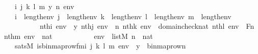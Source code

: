 \begin{isabellebody}
\ \ \ i\ j\ k\ l\ m\ y\ n\ env\ \isanewline
\ \ \ {\isachardoublequoteopen}i\ {\isacharless}{\kern0pt}\ length{\isacharparenleft}{\kern0pt}env{\isacharparenright}{\kern0pt}{\isachardoublequoteclose}\ {\isachardoublequoteopen}j\ {\isacharless}{\kern0pt}\ length{\isacharparenleft}{\kern0pt}env{\isacharparenright}{\kern0pt}{\isachardoublequoteclose}\ {\isachardoublequoteopen}k\ {\isacharless}{\kern0pt}\ length{\isacharparenleft}{\kern0pt}env{\isacharparenright}{\kern0pt}{\isachardoublequoteclose}\ {\isachardoublequoteopen}l\ {\isacharless}{\kern0pt}\ length{\isacharparenleft}{\kern0pt}env{\isacharparenright}{\kern0pt}{\isachardoublequoteclose}\ {\isachardoublequoteopen}m\ {\isacharless}{\kern0pt}\ length{\isacharparenleft}{\kern0pt}env{\isacharparenright}{\kern0pt}{\isachardoublequoteclose}\isanewline
\ \ \ \ \ \ \ \ \ \ {\isachardoublequoteopen}nth{\isacharparenleft}{\kern0pt}i{\isacharcomma}{\kern0pt}\ env{\isacharparenright}{\kern0pt}\ {\isacharequal}{\kern0pt}\ y{\isachardoublequoteclose}\ {\isachardoublequoteopen}nth{\isacharparenleft}{\kern0pt}j{\isacharcomma}{\kern0pt}\ env{\isacharparenright}{\kern0pt}\ {\isacharequal}{\kern0pt}\ n{\isachardoublequoteclose}\ {\isachardoublequoteopen}nth{\isacharparenleft}{\kern0pt}k{\isacharcomma}{\kern0pt}\ env{\isacharparenright}{\kern0pt}\ {\isacharequal}{\kern0pt}\ domain{\isacharparenleft}{\kern0pt}check{\isacharparenleft}{\kern0pt}nat{\isacharparenright}{\kern0pt}{\isacharparenright}{\kern0pt}{\isachardoublequoteclose}\ {\isachardoublequoteopen}nth{\isacharparenleft}{\kern0pt}l{\isacharcomma}{\kern0pt}\ env{\isacharparenright}{\kern0pt}\ {\isacharequal}{\kern0pt}\ Fn{\isachardoublequoteclose}\ {\isachardoublequoteopen}nth{\isacharparenleft}{\kern0pt}m{\isacharcomma}{\kern0pt}\ env{\isacharparenright}{\kern0pt}\ {\isacharequal}{\kern0pt}\ nat{\isachardoublequoteclose}\ \isanewline
\ \ \ \ \ \ \ \ \ \ {\isachardoublequoteopen}env\ {\isasymin}\ list{\isacharparenleft}{\kern0pt}M{\isacharparenright}{\kern0pt}{\isachardoublequoteclose}\ {\isachardoublequoteopen}n\ {\isasymin}\ nat{\isachardoublequoteclose}\ \isanewline
\ \ \ {\isachardoublequoteopen}sats{\isacharparenleft}{\kern0pt}M{\isacharcomma}{\kern0pt}\ is{\isacharunderscore}{\kern0pt}binmap{\isacharunderscore}{\kern0pt}row{\isacharprime}{\kern0pt}{\isacharunderscore}{\kern0pt}fm{\isacharparenleft}{\kern0pt}i{\isacharcomma}{\kern0pt}\ j{\isacharcomma}{\kern0pt}\ k{\isacharcomma}{\kern0pt}\ l{\isacharcomma}{\kern0pt}\ m{\isacharparenright}{\kern0pt}{\isacharcomma}{\kern0pt}\ env{\isacharparenright}{\kern0pt}\ {\isasymlongleftrightarrow}\ y\ {\isacharequal}{\kern0pt}\ binmap{\isacharunderscore}{\kern0pt}row{\isacharprime}{\kern0pt}{\isacharparenleft}{\kern0pt}n{\isacharparenright}{\kern0pt}{\isachardoublequoteclose}\ \isanewline

\end{isabellebody}
